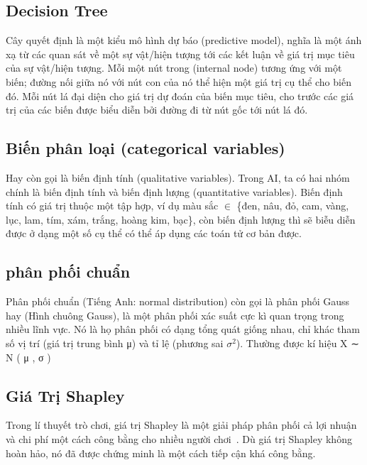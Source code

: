 \documentclass[12pt, a4paper]{article}
\theoremstyle{plain}
\theoremstyle{proposition}
\theoremstyle{lemma}
\begin{document}
\subsection{Decision Tree}
Cây quyết định là một kiểu mô hình dự báo (predictive model), nghĩa là một ánh xạ từ các quan sát về một sự vật/hiện tượng tới các kết luận về giá trị mục tiêu của sự vật/hiện tượng. Mỗi một nút trong (internal node) tương ứng với một biến; đường nối giữa nó với nút con của nó thể hiện một giá trị cụ thể cho biến đó. Mỗi nút lá đại diện cho giá trị dự đoán của biến mục tiêu, cho trước các giá trị của các biến được biểu diễn bởi đường đi từ nút gốc tới nút lá đó.

\subsection{Biến phân loại (categorical variables)}
Hay còn gọi là biến định tính (qualitative variables). Trong AI, ta có hai nhóm chính là biến định tính và biến định lượng (quantitative variables). Biến định tính có giá trị thuộc một tập hợp, ví dụ màu sắc $\in$ \{đen, nâu, đỏ, cam, vàng, lục, lam, tím, xám, trắng, hoàng kim, bạc\}, còn biến định lượng thì sẽ biễu diễn được ở dạng một số cụ thể có thể áp dụng các toán tử cơ bản được.
\subsection{ phân phối chuẩn}
Phân phối chuẩn (Tiếng Anh: normal distribution) còn gọi là phân phối Gauss hay (Hình chuông Gauss), là một phân phối xác suất cực kì quan trọng trong nhiều lĩnh vực. Nó là họ phân phối có dạng tổng quát giống nhau, chỉ khác tham số vị trí (giá trị trung bình μ) và tỉ lệ (phương sai $\sigma^2$). Thường được kí hiệu X ∼ N ( μ , σ ) 
\subsection{Giá Trị Shapley}
Trong lí thuyết trò chơi, giá trị Shapley là một giải pháp phân phối cả lợi nhuận và chi phí một cách công bằng cho nhiều người chơi~\citep{Shapley1953}. Dù giá trị Shapley không hoàn hảo, nó đã được chứng minh là một cách tiếp cận khá công bằng.
\end{document}
